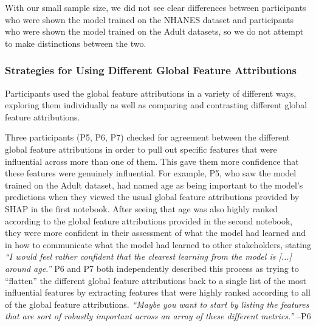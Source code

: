 \documentclass[11pt,dvipdfmx]{article}
\begin{document}
With our small sample size, we did not see clear differences between
participants who were shown the model trained on the NHANES dataset
and participants who were shown the model trained on the Adult
datasets, so we do not attempt to make distinctions between the two.

\subsubsection{Strategies for Using Different Global Feature Attributions}
Participants used the global feature attributions in a variety of
different ways, exploring them individually as well as comparing and
contrasting different global feature attributions.

Three participants (P5, P6, P7) checked for agreement between the
different global feature attributions in order to pull out specific
features that were influential across more than one of them. This gave
them more confidence that these features were genuinely
influential. For example, P5, who saw the model trained on the Adult
dataset, had named age as being important to the model's predictions
when they viewed the usual global feature attributions provided by
SHAP in the first notebook. After seeing that age was also highly
ranked according to the global feature attributions provided in the
second notebook, they were more confident in their assessment of what
the model had learned and in how to communicate what the model had
learned to other stakeholders, stating \textit{``I would feel rather
  confident that the clearest learning from the model is [...]  around
  age.''} P6 and P7 both independently described this process as
trying to ``flatten'' the different global feature attributions back
to a single list of the most influential features by extracting
features that were highly ranked according to all of the global
feature attributions. \textit{``Maybe you want to start by listing the
  features that are sort of robustly important across an array of
  these different metrics.''} --P6 
\end{document}
